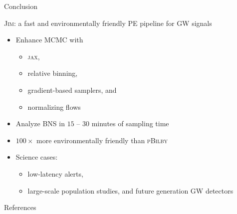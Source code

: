\documentclass[usenames,dvipsnames,t]{beamer}
\begin{document}
\begin{frame}{Conclusion}

  \def\x{3mm}
  \def\y{2mm}

  \textsc{Jim}: a fast and environmentally friendly PE pipeline for GW signals
  
  \vspace{\y}

  \begin{itemize}
    \item Enhance MCMC with
    \begin{itemize}
      \vspace{\y}
      \item \textsc{jax},
      \vspace{\y}
      \item relative binning,
      \vspace{\y}
      \item gradient-based samplers, and
      \vspace{\y}
      \item normalizing flows
    \end{itemize}
    
    
    \vspace{\x}

    \item Analyze BNS in $15$ -- $30$ minutes of sampling time
    
    \vspace{\x}

    \item $100 \times$ more environmentally friendly than \textsc{pBilby}

    \vspace{\x}

    \item Science cases:
    \begin{itemize}
      \vspace{\y}
      \item low-latency alerts,

      \vspace{\y}

      \item large-scale population studies, and future generation GW detectors
    \end{itemize}
    
  \end{itemize}
\end{frame}

\begin{frame}{References}

\printbibliography
    
\end{frame}
\end{document}
